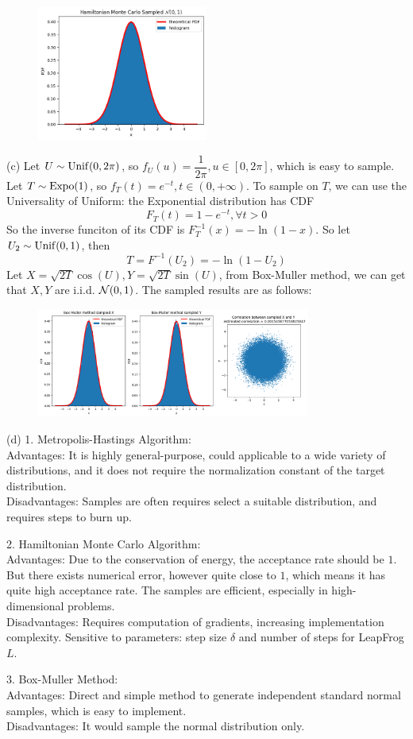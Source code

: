 \begin{homeworkProblem}
\begin{figure}[h]
    \includegraphics[width=0.5\textwidth]{./figure/p4/Hamiltonian.png}
\end{figure}

(c) Let $U\sim \operatorname{Unif}(0,2\pi)$, so $f_U(u)=\dfrac{1}{2\pi},u\in [0,2\pi]$, which is easy to sample. Let $T\sim \operatorname{Expo}(1)$, so $f_T(t)=e^{-t}, t\in (0,+\infty)$. To sample on $T$, we can use the Universality of Uniform: the Exponential distribution has CDF
$$F_T(t) = 1 - e^{-t}, \forall t > 0$$
So the inverse funciton of its CDF is $ F^{-1}_T(x) = -\ln(1-x)$. So let $U_2\sim \operatorname{Unif}(0,1)$, then
$$T = F^{-1}(U_2)=-\ln(1-U_2)$$
Let $X=\sqrt{2T}\cos(U), Y=\sqrt{2T}\sin(U)$, from Box-Muller method, we can get that $X,Y$ are i.i.d. $\mathcal{N}(0,1)$. The sampled results are as follows:
\begin{figure}[h]
    \centering
    \includegraphics[width=0.8\textwidth]{./figure/p4/box_muller.png}
\end{figure}

(d) 1. Metropolis-Hastings Algorithm: \\
Advantages: It is highly general-purpose, could applicable to a wide variety of distributions, and it does not require the normalization constant of the target distribution. \\
Disadvantages: Samples are often requires select a suitable distribution, and requires steps to burn up.

2. Hamiltonian Monte Carlo Algorithm: \\
Advantages: Due to the conservation of energy, the acceptance rate should be $1$. But there exists numerical error, however quite close to $1$, which means it has quite high acceptance rate. The samples are efficient, especially in high-dimensional problems. \\
Disadvantages: Requires computation of gradients, increasing implementation complexity. Sensitive to parameters: step size $\delta$ and number of steps for LeapFrog $L$.

3. Box-Muller Method: \\
Advantages: Direct and simple method to generate independent standard normal samples, which is easy to implement. \\
Disadvantages: It would sample the normal distribution only.

\end{homeworkProblem}

\newpage